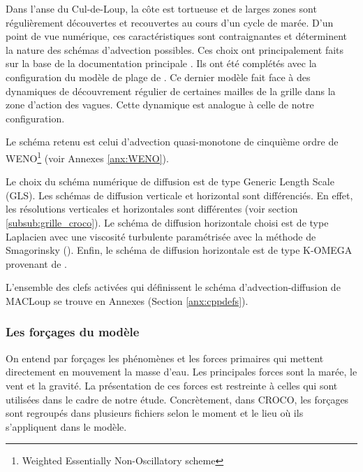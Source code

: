 \documentclass[10pt,a4paper,titlepage]{article}
\begin{document}
Dans l'anse du Cul-de-Loup, la côte est tortueuse et de larges zones sont régulièrement découvertes et recouvertes au cours d'un cycle de marée.
D'un point de vue numérique, ces caractéristiques sont contraignantes et déterminent la nature des schémas d'advection possibles.
Ces choix ont principalement faits sur la base de la documentation principale \parencite{cppkeys_description}.
Ils ont été complétés avec la configuration du modèle de plage de  \cite{swash_article_MARCHESIELLO2021101816}.
Ce dernier modèle fait face à des dynamiques de découvrement régulier de certaines mailles de la grille dans la zone d'action des vagues.
Cette dynamique est analogue à celle de notre configuration.

Le schéma retenu est celui d'advection quasi-monotone de cinquième ordre de WENO\footnote{Weighted Essentially Non-Oscillatory scheme} (voir Annexes \ref{anx:WENO}).

Le choix du schéma numérique de diffusion est de type Generic Length Scale (GLS).
Les schémas de diffusion verticale et horizontal sont différenciés.
En effet, les résolutions verticales et horizontales sont différentes (voir section \ref{subsub:grille_croco}).
Le schéma de diffusion horizontale choisi est de type Laplacien avec une viscosité turbulente paramétrisée avec la méthode de Smagorinsky (\cite{schemas_diffusion_horizontale}).
Enfin, le schéma de diffusion horizontale est de type K-OMEGA provenant de \cite{GLS_KOMEGA_kolmogorov1941equations}.

L'ensemble des clefs activées qui définissent le schéma d'advection-diffusion de MACLoup se trouve en Annexes (Section \ref{anx:cppdefs}).


\subsubsection{Les forçages du modèle}
\label{subsub:forcages}
On entend par forçages les phénomènes et les forces primaires qui mettent directement en mouvement la masse d'eau.
Les principales forces sont la marée, le vent et la gravité.
La présentation de ces forces est restreinte à celles qui sont utilisées dans le cadre de notre étude.
Concrètement, dans CROCO, les forçages sont regroupés dans plusieurs fichiers selon le moment et le lieu où ils s'appliquent dans le modèle.
\end{document}
